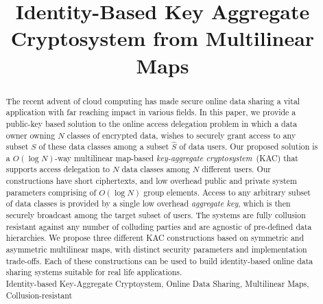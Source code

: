 \documentclass{class/llncs}
\title{Identity-Based Key Aggregate Cryptosystem from Multilinear Maps}
\begin{document}
% 
\author{}
\institute{}

\maketitle
{}


\begin{abstract}

The recent advent of cloud computing has made secure online data sharing a vital application with far reaching impact in various fields. In this paper, we provide a public-key based solution to the online access delegation problem in which a data owner owning $N$ classes of encrypted data, wishes to securely grant access to any subset $S$ of these data classes among a subset $\hat{S}$ of data users. Our proposed solution is a $O(\log N)$-way multilinear map-based \emph{key-aggregate cryptosystem}~(KAC) that supports access delegation to $N$ data classes among $N$ different users. Our constructions have short ciphertexts, and low overhead public and private system parameters comprising of $O(\log N)$ group elements. Access to any arbitrary subset of data classes is provided by a single low overhead \emph{aggregate key}, which is then securely broadcast among the target subset of users. The systems are fully collusion resistant against any number of colluding parties and are agnostic of pre-defined data hierarchies. We propose three different KAC constructions based on symmetric and asymmetric multilinear maps, with distinct security parameters and implementation trade-offs. Each of these constructions can be used to build identity-based online data sharing systems suitable for real life applications.\\  

 Identity-based Key-Aggregate Cryptoystem, Online Data Sharing, Multilinear Maps, Collusion-resistant
\end{abstract}












\newpage

\end{document}
